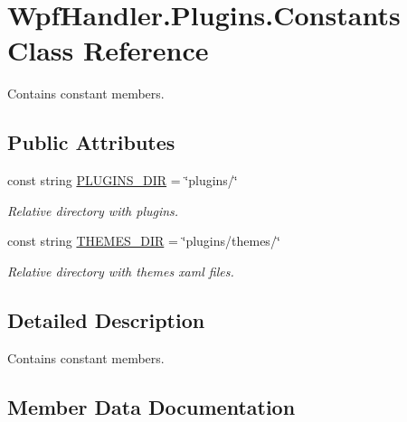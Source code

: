 \hypertarget{class_wpf_handler_1_1_plugins_1_1_constants}{}\section{Wpf\+Handler.\+Plugins.\+Constants Class Reference}
\label{class_wpf_handler_1_1_plugins_1_1_constants}


Contains constant members.  


\subsection*{Public Attributes}
\begin{DoxyCompactItemize}
\item 
const string \mbox{\hyperlink{class_wpf_handler_1_1_plugins_1_1_constants_a96f55ef86fe92a534722f4788340f390}{P\+L\+U\+G\+I\+N\+S\+\_\+\+D\+IR}} = \char`\"{}plugins/\char`\"{}
\begin{DoxyCompactList}\small\item\em Relative directory with plugins. \end{DoxyCompactList}\item 
const string \mbox{\hyperlink{class_wpf_handler_1_1_plugins_1_1_constants_aa7969fd3e77b585b42f0c99a5440dbb2}{T\+H\+E\+M\+E\+S\+\_\+\+D\+IR}} = \char`\"{}plugins/themes/\char`\"{}
\begin{DoxyCompactList}\small\item\em Relative directory with themes xaml files. \end{DoxyCompactList}\end{DoxyCompactItemize}


\subsection{Detailed Description}
Contains constant members. 



\subsection{Member Data Documentation}
\mbox{\label{class_wpf_handler_1_1_plugins_1_1_constants_a96f55ef86fe92a534722f4788340f390}} 
